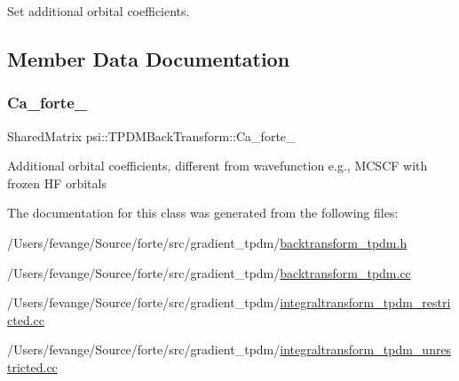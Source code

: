 Set additional orbital coefficients. 



\subsection{Member Data Documentation}
\mbox{\label{classpsi_1_1_t_p_d_m_back_transform_a5cc1fd173565060a44911109c9436ad8}} 
\subsubsection{\texorpdfstring{Ca\+\_\+forte\+\_\+}{Ca\_forte\_}}
{\footnotesize\ttfamily Shared\+Matrix psi\+::\+T\+P\+D\+M\+Back\+Transform\+::\+Ca\+\_\+forte\+\_\+\hspace{0.3cm}{\ttfamily [protected]}}

Additional orbital coefficients, different from wavefunction e.\+g., M\+C\+S\+CF with frozen HF orbitals 

The documentation for this class was generated from the following files\+:\begin{DoxyCompactItemize}
\item 
/\+Users/fevange/\+Source/forte/src/gradient\+\_\+tpdm/\mbox{\hyperlink{backtransform__tpdm_8h}{backtransform\+\_\+tpdm.\+h}}\item 
/\+Users/fevange/\+Source/forte/src/gradient\+\_\+tpdm/\mbox{\hyperlink{backtransform__tpdm_8cc}{backtransform\+\_\+tpdm.\+cc}}\item 
/\+Users/fevange/\+Source/forte/src/gradient\+\_\+tpdm/\mbox{\hyperlink{integraltransform__tpdm__restricted_8cc}{integraltransform\+\_\+tpdm\+\_\+restricted.\+cc}}\item 
/\+Users/fevange/\+Source/forte/src/gradient\+\_\+tpdm/\mbox{\hyperlink{integraltransform__tpdm__unrestricted_8cc}{integraltransform\+\_\+tpdm\+\_\+unrestricted.\+cc}}\end{DoxyCompactItemize}

